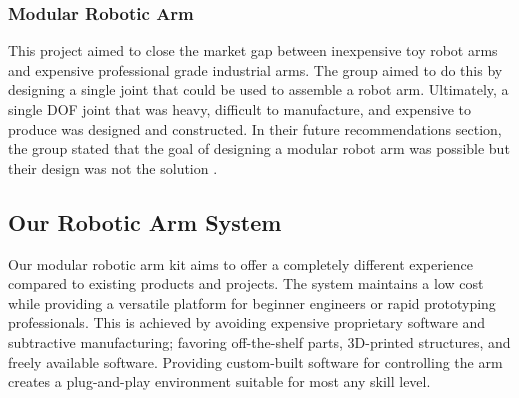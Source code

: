 \subsubsection{Modular Robotic Arm}
This project aimed to close the market gap between inexpensive toy robot arms and expensive professional grade industrial arms. The group aimed to do this by designing a single joint that could be used to assemble a robot arm. Ultimately, a single DOF joint that was heavy, difficult to manufacture, and expensive to produce was designed and constructed. In their future recommendations section, the group stated that the goal of designing a modular robot arm was possible but their design was not the solution \cite{MRA}.

\subsection{Our Robotic Arm System}
Our modular robotic arm kit aims to offer a completely different experience compared to existing products and projects. The system maintains a low cost while providing a versatile platform for beginner engineers or rapid prototyping professionals. This is achieved by avoiding expensive proprietary software and subtractive manufacturing; favoring off-the-shelf parts, 3D-printed structures, and freely available software. Providing custom-built software for controlling the arm creates a plug-and-play environment suitable for most any skill level.




